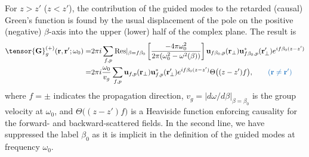 \documentclass[preprint, aps,pra,onecolumn]{revtex4-1} %
\newcommand{\change}[1]{{\color{RoyalBlue} #1}}
\begin{document}
For $z>z'$ ($z<z'$), the contribution of the guided modes to the retarded (causal) Green's function is found by the 
usual displacement of the pole on the positive (negative) $\beta$-axis into the upper (lower) half of 
the complex plane. The result is \cite{manga_rao_single_2007}
	\begin{align} 
		\tensor{\mathbf{G}}^{(+)}_g(\br,\br'; \omega_0) = &2\pi i \sum_{f,p}  {\rm Res}\vert_{\beta =f\beta_0} 
\left[\frac{-4\pi \omega_0^2 }{2\pi ( \omega_0^2-\omega^2(\beta))}\right]  \mathbf{u}_{f\beta_0, p} 
(\br_\perp)\mathbf{u}^*_{f\beta_0, p} (\br_{\perp}^\prime)e^{if \beta_0 (z-z')} \nonumber \\
= & 2\pi i \frac{\omega_0}{v_g } \sum_{f,p} \mathbf{u}_{f, p} (\br_\perp)\mathbf{u}^*_{f , p} 
(\br_{\perp}^\prime) e^{i f \beta_0(z-z')} \Theta \big( (z-z')f \big), \quad \quad \change{(\mbf{r} \neq \mbf{r}')} \label{Eq::GreensGuided}
	\end{align}
where $f=\pm$ indicates the propagation direction, $v_g= \vert d\omega/d\beta \vert_{\beta=\beta_0}$ is the group velocity at $\omega_0$, and $\Theta \big( (z-z')f \big)$ is a Heaviside function enforcing causality for the forward- and backward-scattered fields. In the second line, we have suppressed the label $\beta_0$ as it is implicit in the definition of the guided modes at frequency $\omega_0$. 
\end{document}
